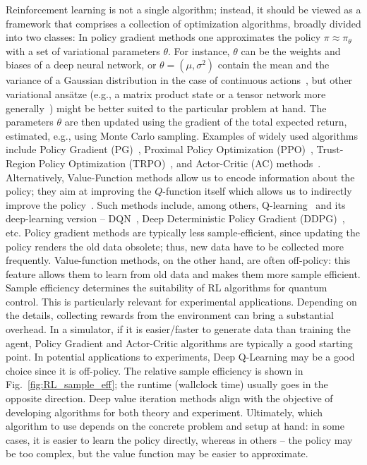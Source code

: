 Reinforcement learning is not a single algorithm; instead, it should be viewed as a framework that comprises a collection of optimization algorithms, broadly divided into two classes: In policy gradient methods one approximates the policy $\pi\approx\pi_\theta$ with a set of variational parameters $\theta$. For instance, $\theta$ can be the weights and biases of a deep neural network, or $\theta=(\mu,\sigma^2)$ contain the mean and the variance of a Gaussian distribution in the case of continuous actions~\cite{sutton_barto_rl}, but other variational ans\"atze (e.g., a matrix product state or a tensor network more generally~\cite{metz2023self,rose2024combining}) might be better suited to the particular problem at hand. The parameters $\theta$ are then updated using the gradient of the total expected return, estimated, e.g., using Monte Carlo sampling. Examples of widely used algorithms include Policy Gradient (PG)~\cite{williams1992simple}, Proximal Policy Optimization (PPO)~\cite{schulman2017proximal}, Trust-Region Policy Optimization (TRPO)~\cite{schulman2015trust}, and Actor-Critic (AC) methods~\cite{konda1999actor}. Alternatively, Value-Function methods allow us to encode information about the policy; they aim at improving the $Q$-function itself which allows us to indirectly improve the policy~\cite{sutton_barto_rl}. Such methods include, among others, Q-learning~\cite{watkins1992q-learning} and its deep-learning version -- DQN~\cite{mnih2015human}, Deep Deterministic Policy Gradient (DDPG)~\cite{lillicrap2015continuous}, etc. Policy gradient methods are typically less sample-efficient, since updating the policy renders the old data obsolete; thus, new data have to be collected more frequently. Value-function methods, on the other hand, are often off-policy: this feature allows them to learn from old data and makes them more sample efficient. 
Sample efficiency determines the suitability of RL algorithms for quantum control. This is particularly relevant for experimental applications. Depending on the details, collecting rewards from the environment can bring a substantial overhead. In a simulator, if it is easier/faster to generate data than training the agent, Policy Gradient and Actor-Critic algorithms are typically a good starting point. In potential applications to experiments, Deep Q-Learning may be a good choice since it is off-policy. The relative sample efficiency is shown in Fig.~\ref{fig:RL_sample_eff}; the runtime (wallclock time) usually goes in the opposite direction. Deep value iteration methods align with the objective of developing algorithms for both theory and experiment.
Ultimately, which algorithm to use depends on the concrete problem and setup at hand: in some cases, it is easier to learn the policy directly, whereas in others -- the policy may be too complex, but the value function may be easier to approximate.

